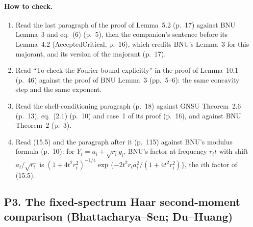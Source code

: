 \documentclass[11pt]{article}
\newcommand{\ploc}[2]{#1}
\begin{document}
\paragraph{How to check.}
\begin{enumerate}
\item Read the last paragraph of the proof of
 \ploc{Lemma~5.2 (p.~17)}{profile-spectral.tex:422--428} against BNU Lemma~3
 and eq.~(6) (p.~5), then the companion's sentence before its
 \ploc{Lemma~4.2 (AcceptedCritical, p.~16)}{AcceptedCritical spherical.tex:144--152},
 which credits BNU's Lemma~3 for this majorant, and its version of the
 majorant \ploc{(p.~17)}{AcceptedCritical spherical.tex:211--216}.
\item Read ``To check the Fourier bound explicitly'' in the proof of
 \ploc{Lemma~10.1 (p.~46)}{profile-orbits.tex:323--335} against the proof of
 BNU Lemma~3 (pp.~5--6): the same concavity step and the same exponent.
\item Read the shell-conditioning paragraph
 \ploc{(p.~18)}{profile-spectral.tex:441--458} against GNSU Theorem~2.6
 (p.~13), eq.~(2.1) (p.~10) and case~1 of its proof (p.~16), and against BNU
 Theorem~2 (p.~3).
\item Read \ploc{(15.5) and the paragraph after it (p.~115)}{cap-static.tex:162--175}
 against BNU's modulus formula (p.~10): for $Y_i=a_i+\sqrt{r_i}g_i$, BNU's
 factor at frequency $r_it$ with shift $a_i/\sqrt{r_i}$ is
 $(1+4t^2r_i^2)^{-1/4}\exp\{-2t^2r_ia_i^2/(1+4t^2r_i^2)\}$, the $i$th factor
 of (15.5).
\end{enumerate}
\subsection{P3. The fixed-spectrum Haar second-moment comparison (Bhattacharya--Sen; Du--Huang)}\label{f:P3}
\end{document}
